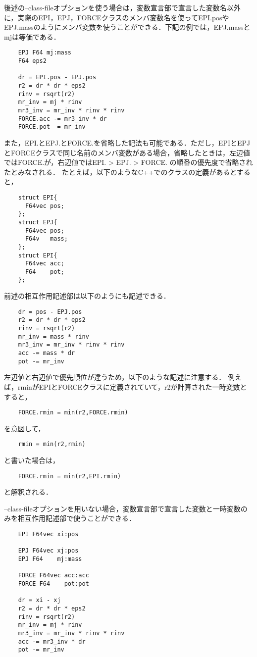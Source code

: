 \documentclass{article}
\begin{document}
後述の--class-fileオプションを使う場合は，変数宣言部で宣言した変数名以外に，実際のEPI，EPJ，FORCEクラスのメンバ変数名を使ってEPI.posやEPJ.massのようにメンバ変数を使うことができる．下記の例では，EPJ.massとmjは等価である．
\begin{verbatim}
	EPJ F64 mj:mass
	F64 eps2

	dr = EPI.pos - EPJ.pos
	r2 = dr * dr * eps2
	rinv = rsqrt(r2)
	mr_inv = mj * rinv
	mr3_inv = mr_inv * rinv * rinv
	FORCE.acc -= mr3_inv * dr
	FORCE.pot -= mr_inv
\end{verbatim}
また，EPI.とEPJ.とFORCE.を省略した記法も可能である．ただし，EPIとEPJとFORCEクラスで同じ名前のメンバ変数がある場合，省略したときは，左辺値ではFORCE.が，右辺値ではEPI. > EPJ. > FORCE. の順番の優先度で省略されたとみなされる．
たとえば，以下のようなC++でのクラスの定義があるとすると，
\begin{verbatim}
	struct EPI{
	  F64vec pos;
	};
	struct EPJ{
	  F64vec pos;
	  F64v   mass;
	};
	struct EPI{
	  F64vec acc;
	  F64    pot;
	};
\end{verbatim}
前述の相互作用記述部は以下のようにも記述できる．
\begin{verbatim}
	dr = pos - EPJ.pos
	r2 = dr * dr * eps2
	rinv = rsqrt(r2)
	mr_inv = mass * rinv
	mr3_inv = mr_inv * rinv * rinv
	acc -= mass * dr
	pot -= mr_inv
\end{verbatim}

左辺値と右辺値で優先順位が違うため，以下のような記述に注意する．
例えば，rminがEPIとFORCEクラスに定義されていて，r2が計算された一時変数とすると，
\begin{verbatim}
	FORCE.rmin = min(r2,FORCE.rmin)
\end{verbatim}
を意図して，
\begin{verbatim}
	rmin = min(r2,rmin)
\end{verbatim}
と書いた場合は，
\begin{verbatim}
	FORCE.rmin = min(r2,EPI.rmin)
\end{verbatim}
と解釈される．

--class-fileオプションを用いない場合，変数宣言部で宣言した変数と一時変数のみを相互作用記述部で使うことができる．
\begin{verbatim}
	EPI F64vec xi:pos

	EPJ F64vec xj:pos
	EPJ F64    mj:mass

	FORCE F64vec acc:acc
	FORCE F64    pot:pot

	dr = xi - xj
	r2 = dr * dr * eps2
	rinv = rsqrt(r2)
	mr_inv = mj * rinv
	mr3_inv = mr_inv * rinv * rinv
	acc -= mr3_inv * dr
	pot -= mr_inv
\end{verbatim}
\end{document}
